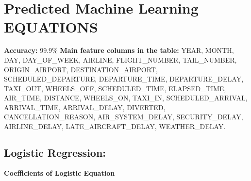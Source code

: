 \documentclass[conference]{IEEEtran}
\begin{document}
\section{Predicted Machine Learning EQUATIONS}
\textbf{Accuracy:} 99.9\%
\noindent \textbf{Main feature columns in the table:}
\noindent YEAR, MONTH, DAY, DAY\_OF\_WEEK, AIRLINE, FLIGHT\_NUMBER, TAIL\_NUMBER, ORIGIN\_AIRPORT, DESTINATION\_AIRPORT, SCHEDULED\_DEPARTURE, DEPARTURE\_TIME, DEPARTURE\_DELAY, TAXI\_OUT, WHEELS\_OFF, SCHEDULED\_TIME, ELAPSED\_TIME, AIR\_TIME, DISTANCE, WHEELS\_ON, TAXI\_IN, SCHEDULED\_ARRIVAL, ARRIVAL\_TIME, ARRIVAL\_DELAY, DIVERTED, CANCELLATION\_REASON, AIR\_SYSTEM\_DELAY, SECURITY\_DELAY, AIRLINE\_DELAY, LATE\_AIRCRAFT\_DELAY, WEATHER\_DELAY.
\subsection{ Logistic Regression:}\label{subsec3}
\noindent \textbf{Coefficients of Logistic Equation}
\end{document}
